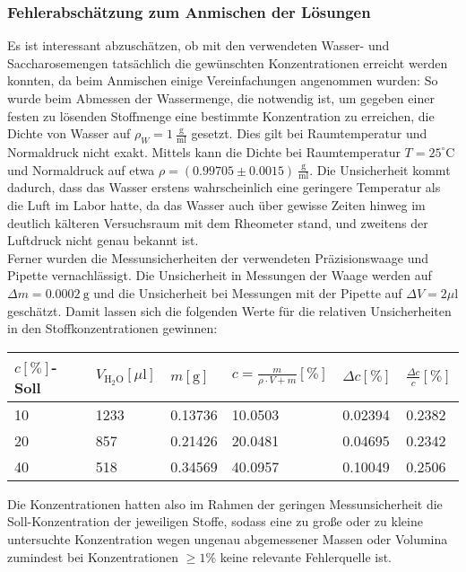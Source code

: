 \documentclass[11pt,a4paper,oneside]{scrartcl}
\begin{document}




\subsubsection{Fehlerabschätzung zum Anmischen der Lösungen}\label{sac_loes_fehler}
Es ist interessant abzuschätzen, ob mit den verwendeten Wasser- und Saccharosemengen tatsächlich die gewünschten Konzentrationen erreicht werden konnten, da beim Anmischen einige Vereinfachungen angenommen wurden:
So wurde beim Abmessen der Wassermenge, die notwendig ist, um gegeben einer festen zu lösenden Stoffmenge eine bestimmte Konzentration zu erreichen, die Dichte von Wasser auf $\rho_W=1\ \mathrm{\frac{g}{ml}}$ gesetzt. Dies gilt bei Raumtemperatur und Normaldruck nicht exakt. 
Mittels \cite{nist_water} kann die Dichte bei Raumtemperatur $T=25^\circ\mathrm C$ und Normaldruck auf etwa $\rho=(0.99705\pm0.0015)\ \mathrm{\frac{g}{ml}}$. Die Unsicherheit kommt dadurch, dass das Wasser erstens wahrscheinlich eine geringere Temperatur als die Luft im Labor hatte, da das Wasser auch über gewisse Zeiten hinweg im deutlich kälteren Versuchsraum mit dem Rheometer stand, und zweitens der Luftdruck nicht genau bekannt ist. \\
Ferner wurden die Messunsicherheiten der verwendeten Präzisionswaage und Pipette vernachlässigt. Die Unsicherheit in Messungen der Waage werden auf $\Delta m=0.0002\ \mathrm g$ und die Unsicherheit bei Messungen mit der Pipette auf $\Delta V=2\mu\mathrm l$ geschätzt. Damit lassen sich die folgenden Werte für die relativen Unsicherheiten in den Stoffkonzentrationen gewinnen:
\begin{table}[!ht]
    \centering
    \begin{tabular}{llllll}
    \hline
        $c [\%]$-Soll & $V_{\mathrm{H_2O}} [\mu \mathrm l]$ & $m [\mathrm g]$ & $c=\frac{m}{\rho\cdot V+m}[\%]$ & $\Delta c[\%]$ & $\frac{\Delta c}{c}[\%]$ \\ \hline
        10 & 1233 & 0.13736 & 10.0503 & 0.02394 & 0.2382 \\ 
        20 & 857 & 0.21426 & 20.0481 & 0.04695 & 0.2342 \\ 
        40 & 518 & 0.34569 & 40.0957 & 0.10049 & 0.2506 \\  \hline
    \end{tabular}
\end{table}
Die Konzentrationen hatten also im Rahmen der geringen Messunsicherheit die Soll-Konzentration der jeweiligen Stoffe, sodass eine zu große oder zu kleine untersuchte Konzentration wegen ungenau abgemessener Massen oder Volumina zumindest bei Konzentrationen $\geq 1\%$ keine relevante Fehlerquelle ist.
\end{document}
